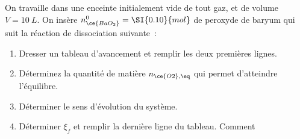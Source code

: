 \documentclass[a4paper, 10pt, final, garamond]{book}
\begin{document}
\begin{enumerate}[label=\sqenumi, leftmargin=10pt]
	\vfill
	On travaille dans une enceinte initialement vide de tout gaz, et de volume $V
		= \SI{10}{L}$. On insère $n_{\ce{BaO_2}}^{0} = \SI{0.10}{mol}$ de peroxyde de
	baryum qui suit la réaction de dissociation suivante~:
	\smallbreak
	\begin{enumerate}
		\item Dresser un tableau d'avancement et remplir les deux premières lignes.
		\item Déterminez la quantité de matière $n_{\ce{O2}, \eq}$ qui permet
		      d'atteindre l'équilibre.
		\item Déterminer le sens d'évolution du système.
		\item Déterminer $\xi_f$ et remplir la dernière ligne du tableau. Comment

\end{enumerate}
\end{enumerate}
\end{document}
